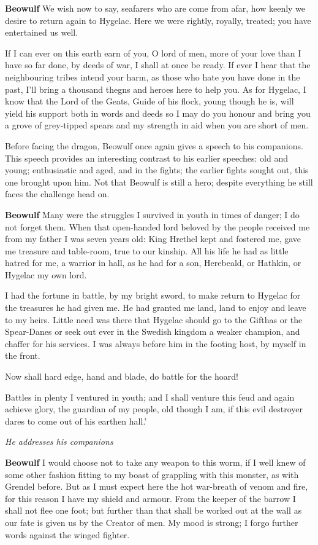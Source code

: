 \documentclass[a4paper]{article}
\begin{document}
{\textbf{Beowulf} We wish now to say, seafarers who
are come from afar, how keenly we desire
to return again to Hygelac. Here we were rightly,
royally, treated; you have entertained us well.

If I can ever on this earth earn of you,
O lord of men, more of your love
than I have so far done, by deeds of war,
I shall at once be ready. If ever I hear
that the neighbouring tribes intend your harm,
as those who hate you have done in the past,
I’ll bring a thousand thegns and heroes
here to help you. As for Hygelac, I know
that the Lord of the Geats, Guide of his flock,
young though he is, will yield his support
both in words and deeds so I may do you honour
and bring you a grove of grey-tipped spears
and my strength in aid when you are short of men.

\centerline{Before facing the dragon, Beowulf once again gives a speech to his
companions. This speech provides an interesting contrast to his earlier speeches:
old and young; enthusiastic and aged, and in the fights; the earlier fights sought out, 
this one brought upon him. Not that Beowulf is still a hero; despite everything
he still faces the challenge head on.}


\textbf{Beowulf} Many were the struggles I survived in youth
in times of danger; I do not forget them.
When that open-handed lord beloved by the people
received me from my father I was seven years old:
King Hrethel kept and fostered me,
gave me treasure and table-room, true to our kinship.
All his life he had as little hatred for me,
a warrior in hall, as he had for a son,
Herebeald, or Hathkin, or Hygelac my own lord.

I had the fortune in battle, by my bright sword,
to make return to Hygelac for the treasures he had given me.
He had granted me land, land to enjoy
and leave to my heirs. Little need was there
that Hygelac should go to the Gifthas or the Spear-Danes
or seek out ever in the Swedish kingdom
a weaker champion, and chaffer for his services.
I was always before him in the footing host,
by myself in the front.

Now shall hard edge,
hand and blade, do battle for the hoard!

Battles in plenty
I ventured in youth; and I shall venture this feud
and again achieve glory, the guardian of my people,
old though I am, if this evil destroyer
dares to come out of his earthen hall.’

\centerline{\textit{He addresses his companions}}

\textbf{Beowulf} I would choose not to take
any weapon to this worm, if I well knew
of some other fashion fitting to my boast
of grappling with this monster, as with Grendel before.
But as I must expect here the hot war-breath
of venom and fire, for this reason I have
my shield and armour. From the keeper of the barrow
I shall not flee one foot; but further than that
shall be worked out at the wall as our fate is given us
by the Creator of men. My mood is strong;
I forgo further words against the winged fighter.

}
\end{document}
